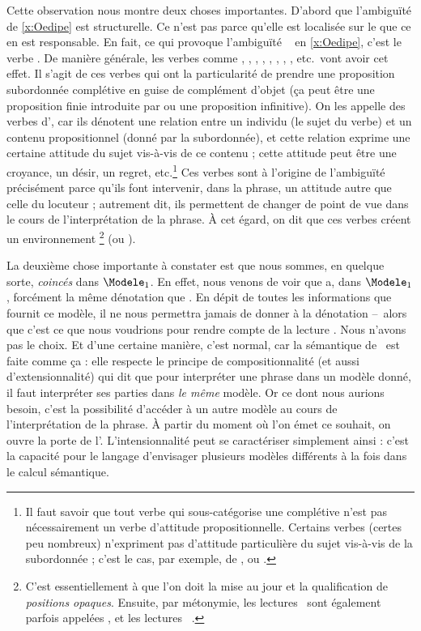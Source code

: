 Cette observation nous montre deux choses importantes. D'abord que l'ambiguïté de \ref{x:Oedipe} est structurelle. Ce n'est pas parce qu'elle est localisée sur le {\GN}  que ce {\GN} en est responsable. En fait, ce qui provoque l'ambiguïté  \vs\  en \ref{x:Oedipe}, c'est le verbe .  De manière générale, les verbes comme , , , ,
, , , , etc.\ vont avoir cet effet.  Il s'agit de ces verbes qui ont la particularité de prendre une proposition subordonnée complétive en guise de complément d'objet (ça peut être une proposition finie introduite par  ou une proposition infinitive). On les appelle des verbes d',\label{VAttProp} 
car ils dénotent une relation  entre un individu (le sujet du verbe) et un contenu propositionnel (donné par la subordonnée), et cette relation exprime une certaine attitude du sujet vis-à-vis de ce contenu ; cette attitude peut être une croyance, un désir, un regret, etc.\footnote{Il faut savoir que tout verbe qui sous-catégorise une complétive n'est pas nécessairement un verbe d'attitude propositionnelle. Certains verbes (certes peu nombreux) n'expriment pas d'attitude particulière du sujet vis-à-vis de la subordonnée ; c'est le cas, par exemple, de ,  ou .} 
Ces verbes sont à l'origine de l'ambiguïté précisément parce qu'ils font intervenir, dans la phrase, un attitude autre que celle du locuteur ; autrement dit, ils permettent de changer de point de vue dans le cours de l'interprétation de la phrase. À cet égard, on dit que ces verbes créent un environnement \footnote{C'est essentiellement à \citet[][\S30--32]{Quine:60fr} que l'on doit la mise au jour et la qualification de \emph{positions opaques}. Ensuite, par métonymie,  les lectures \dedicto\ sont également parfois appelées , et les lectures \dere\ .} (ou ).

La deuxième chose importante à constater 
est que nous sommes, en quelque sorte,
\emph{coincés} dans $\Modele_1$.  
En effet, nous venons de voir que  a, dans $\Modele_1$, forcément la même dénotation que . En dépit de toutes les informations que fournit ce modèle, il ne nous permettra jamais de donner à  la dénotation  --~alors que c'est ce que nous voudrions pour rendre compte de la lecture .  Nous n'avons pas le choix. 
Et d'une certaine manière, c'est normal, car la sémantique de \LO\ est faite comme ça :
elle respecte le principe de compositionnalité (et aussi  d'extensionnalité) qui dit que pour interpréter une phrase dans un modèle donné, il faut interpréter ses parties dans \emph{le même} modèle. 
Or ce dont nous aurions besoin, c'est la possibilité d'accéder à un autre modèle au cours de l'interprétation de la phrase.  À partir du moment où l'on émet ce souhait, on ouvre la porte de l'. 
L'intensionnalité peut se caractériser simplement ainsi : c'est la capacité pour le langage d'envisager plusieurs modèles différents à la fois dans le calcul sémantique. 

